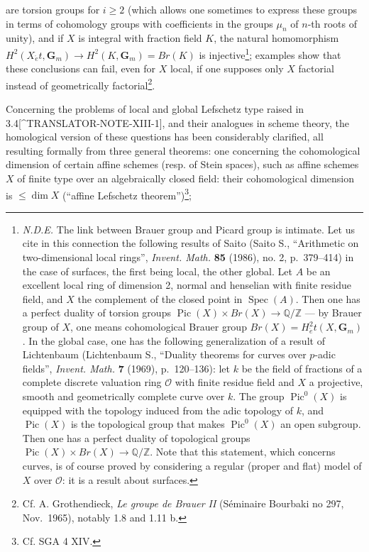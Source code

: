 \documentclass[
]{article}
\begin{document}
are torsion groups for \(i \geqslant 2\) (which allows one sometimes to
express these groups in terms of cohomology groups with coefficients in
the groups \(\mu_{n}\) of \(n\)-th roots of unity), and if \(X\) is
integral with fraction field \(K\), the natural homomorphism
\(H^{2}(X_{\acute{e}}t, \mathbf{G}_{m}) \to H^{2}(K, \mathbf{G}_{m}) = Br(K)\)
is injective\footnote{\emph{N.D.E.} The link between Brauer group and
  Picard group is intimate. Let us cite in this connection the following
  results of Saito (Saito S., ``Arithmetic on two-dimensional local
  rings'', \emph{Invent. Math.} \textbf{85} (1986), no. 2, p.~379--414)
  in the case of surfaces, the first being local, the other global. Let
  \(A\) be an excellent local ring of dimension 2, normal and henselian
  with finite residue field, and \(X\) the complement of the closed
  point in \(\operatorname{Spec}(A)\). Then one has a perfect duality of
  torsion groups
  \(\operatorname{Pic}(X) \times Br(X) \to \mathbb{Q}/\mathbb{Z}\) ---
  by Brauer group of \(X\), one means cohomological Brauer group
  \(Br(X) = H^{2}_{\acute{e}}t(X, \mathbf{G}_{m})\). In the global case,
  one has the following generalization of a result of Lichtenbaum
  (Lichtenbaum S., ``Duality theorems for curves over \(p\)-adic
  fields'', \emph{Invent. Math.} \textbf{7} (1969), p.~120--136): let
  \(k\) be the field of fractions of a complete discrete valuation ring
  \(\mathcal{O}\) with finite residue field and \(X\) a projective,
  smooth and geometrically complete curve over \(k\). The group
  \(\operatorname{Pic}^{0}(X)\) is equipped with the topology induced
  from the adic topology of \(k\), and \(\operatorname{Pic}(X)\) is the
  topological group that makes \(\operatorname{Pic}^{0}(X)\) an open
  subgroup. Then one has a perfect duality of topological groups
  \(\operatorname{Pic}(X) \times Br(X) \to \mathbb{Q}/\mathbb{Z}\). Note
  that this statement, which concerns curves, is of course proved by
  considering a regular (proper and flat) model of \(X\) over
  \(\mathcal{O}\): it is a result about surfaces.}; examples show that
these conclusions can fail, even for \(X\) local, if one supposes only
\(X\) factorial instead of geometrically factorial\footnote{Cf. A.
  Grothendieck, \emph{Le groupe de Brauer II} (Séminaire Bourbaki no
  297, Nov.~1965), notably 1.8 and 1.11 b.}.

Concerning the problems of local and global Lefschetz type raised in
3.4{[}\^{}TRANSLATOR-NOTE-XIII-1{]}, and their analogues in scheme
theory, the homological version of these questions has been considerably
clarified, all resulting formally from three general theorems: one
concerning the cohomological dimension of certain affine schemes (resp.
of Stein spaces), such as affine schemes \(X\) of finite type over an
algebraically closed field: their cohomological dimension is
\(\leqslant \dim X\) (``affine Lefschetz theorem'')\footnote{Cf. SGA 4
  XIV.};
\end{document}
